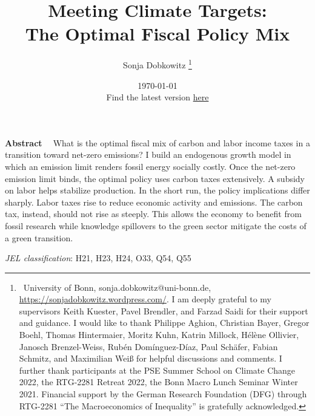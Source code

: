 \documentclass[12pt]{article}
\title{Meeting Climate Targets: \\ \vspace{-2mm} The Optimal Fiscal Policy Mix}
\author{Sonja Dobkowitz
	\thanks{\ {University of Bonn, sonja.dobkowitz@uni-bonn.de, \url{https://sonjadobkowitz.wordpress.com/}.} \newline
		I am deeply grateful to my supervisors Keith Kuester, Pavel Brendler, and Farzad Saidi for their support and guidance. 
		I would like to thank Philippe Aghion, Christian Bayer, Gregor Boehl, Thomas Hintermaier,  Moritz Kuhn, Katrin Millock, Hélène Ollivier,  Janosch Brenzel-Weiss, Rubén Domínguez-Díaz, Paul Schäfer, Fabian Schmitz, and Maximilian Weiß for helpful discussions and comments.  
		I further thank participants at the PSE Summer School on Climate Change 2022, the RTG-2281 Retreat 2022, the Bonn Macro Lunch Seminar Winter 2021.
		Financial support by the German Research Foundation (DFG) through RTG-2281 “The Macroeconomics of Inequality” is gratefully acknowledged.}}
\date{\today \\ \vspace{1mm} \small{Find the latest version  \href{https://sonjadobkowitz.wordpress.com/job-market-paper/}{here}}
}
\renewenvironment{abstract}
{\small
	\list{}{
		\setlength{\leftmargin}{0.025\textwidth}%
		\setlength{\rightmargin}{\leftmargin}%
	}%
	\item\relax}
{\endlist}
\begin{document}
	\maketitle
	\begin{abstract}
		\begin{onehalfspacing}
			\textbf{Abstract \ }
			What is the optimal fiscal mix of  carbon and labor income taxes in a transition toward net-zero emissions? I build an endogenous growth model in which an emission limit renders fossil energy socially costly. Once the net-zero emission limit binds, the optimal policy uses carbon taxes extensively. A subsidy on labor helps stabilize production. In the short run, the policy implications differ sharply. Labor taxes rise to reduce economic activity and emissions. The carbon tax, instead, should not rise as steeply. This allows the economy to benefit from fossil research while knowledge spillovers to the green sector mitigate the costs of a green transition.
			
			
			\noindent \textit{JEL classification}: H21, H23, H24, O33, Q54, Q55
			
		\end{onehalfspacing}
	\end{abstract}
	
	
	
	
	
	
	
	
	
\end{document}
